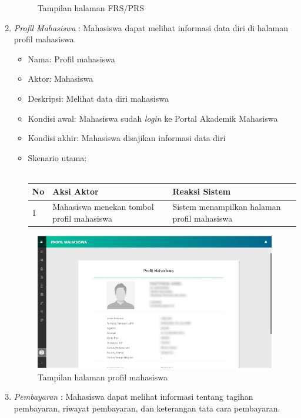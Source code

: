 \begin{enumerate}
\begin{figure}[H]
				\caption{Tampilan halaman FRS/PRS} 
				\label{fig:pam_frs}
			\end{figure}
    \item \textit{Profil Mahasiswa} : 
    Mahasiswa dapat melihat informasi data diri di halaman profil mahasiswa.
    \begin{itemize}
			\item Nama: Profil mahasiswa
			\item Aktor: Mahasiswa
			\item Deskripsi: Melihat data diri mahasiswa
			\item Kondisi awal: Mahasiswa sudah \textit{login} ke Portal Akademik Mahasiswa
			\item Kondisi akhir: Mahasiswa disajikan informasi data diri
			\item Skenario utama: \\ \\
        \begin{tabular}{|p{0.5cm} |p{6cm}| p{6cm}|}
        \hline
            No & Aksi Aktor &  Reaksi Sistem \\ \hline     
            1 & Mahasiswa menekan tombol profil mahasiswa & Sistem menampilkan halaman profil mahasiswa \\ \hline 
        \end{tabular}
    \end{itemize}
     \begin{figure}[H]
				\centering
				\includegraphics[scale=0.7]{DokumenSkripsi/Gambar/profil}
				\caption{Tampilan halaman profil mahasiswa} 
				\label{fig:pam_profil}
			\end{figure}
	 \item \textit{Pembayaran} : 
    Mahasiswa dapat melihat informasi tentang tagihan pembayaran, riwayat pembayaran, dan keterangan tata cara pembayaran.

\end{enumerate}
